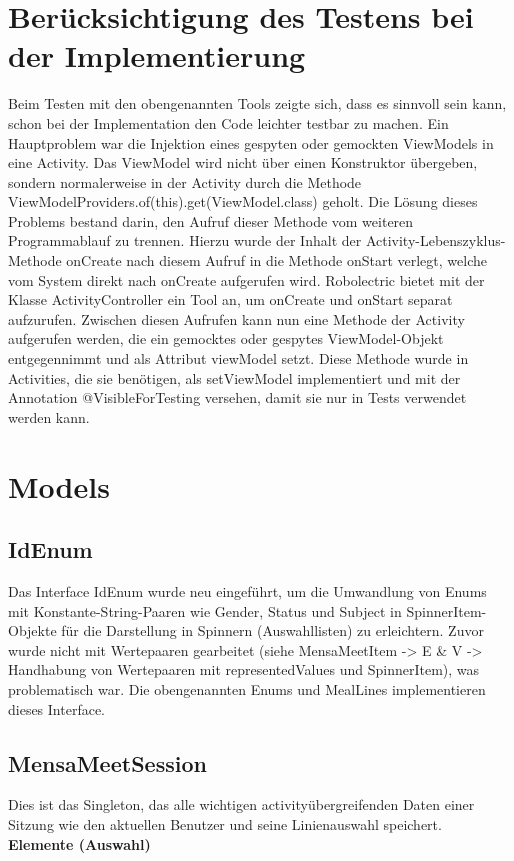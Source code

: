 \documentclass[a4paper]{scrreprt}
\begin{document}
\section{Berücksichtigung des Testens bei der Implementierung}
Beim Testen mit den obengenannten Tools zeigte sich, dass es sinnvoll sein kann, schon bei der Implementation den Code leichter testbar zu machen. Ein Hauptproblem war die Injektion eines gespyten oder gemockten ViewModels in eine Activity. Das ViewModel wird nicht über einen Konstruktor übergeben, sondern normalerweise in der Activity durch die Methode ViewModelProviders.of(this).get(ViewModel.class) geholt. Die Lösung dieses Problems bestand darin, den Aufruf dieser Methode vom weiteren Programmablauf zu trennen. Hierzu wurde der Inhalt der Activity-Lebenszyklus-Methode onCreate nach diesem Aufruf in die Methode onStart verlegt, welche vom System direkt nach onCreate aufgerufen wird. Robolectric bietet mit der Klasse ActivityController ein Tool an, um onCreate und onStart separat aufzurufen. Zwischen diesen Aufrufen kann nun eine Methode der Activity aufgerufen werden, die ein gemocktes oder gespytes ViewModel-Objekt entgegennimmt und als Attribut viewModel setzt. Diese Methode wurde in Activities, die sie benötigen, als setViewModel implementiert und mit der Annotation @VisibleForTesting versehen, damit sie nur in Tests verwendet werden kann.



\section{Models}
\subsection{IdEnum}
Das Interface IdEnum wurde neu eingeführt, um die Umwandlung von Enums mit Konstante-String-Paaren wie Gender, Status und Subject in SpinnerItem-Objekte für die Darstellung in Spinnern (Auswahllisten) zu erleichtern. Zuvor wurde nicht mit Wertepaaren gearbeitet (siehe MensaMeetItem -> E \& V -> Handhabung von Wertepaaren mit representedValues und SpinnerItem), was problematisch war. Die obengenannten Enums und MealLines implementieren dieses Interface.

\subsection{MensaMeetSession}
Dies ist das Singleton, das alle wichtigen activityübergreifenden Daten einer Sitzung wie den aktuellen Benutzer und seine Linienauswahl speichert. \\
\textbf{Elemente (Auswahl)}
\end{document}
